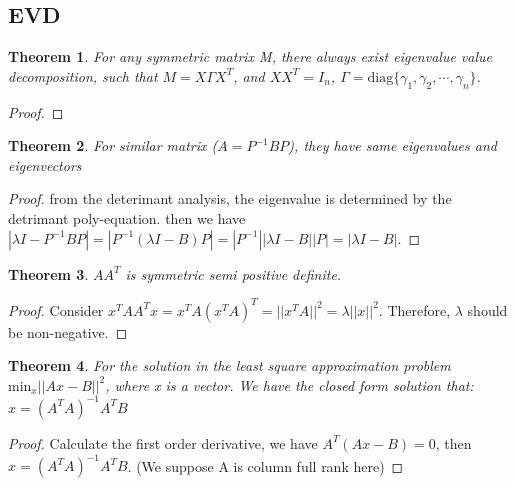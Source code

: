 \documentclass[12pt]{article}
\newtheorem{theorem}{Theorem}
\begin{document}
\subsection{EVD}
\begin{theorem}
	For any symmetric matrix M, there always exist eigenvalue value decomposition, such that $M=X\Gamma X^T$, and $XX^T=I_n$, $\Gamma=\text{diag}\{\gamma_1, \gamma_2,\cdots,\gamma_n\}$.
\end{theorem}
\begin{proof}
	
\end{proof}
\begin{theorem}
	For similar matrix ($A=P^{-1}BP$), they have same eigenvalues and eigenvectors
\end{theorem}
\begin{proof}
	from the deterimant analysis, the eigenvalue is determined by the detrimant poly-equation. then we have $|\lambda I - P^{-1}BP|=|P^{-1}(\lambda I-B)P|=|P^{-1}||\lambda I - B||P|=|\lambda I - B|.$
\end{proof}
\begin{theorem}
	$AA^T$ is symmetric semi positive definite.
\end{theorem}
\begin{proof}
	Consider $x^TAA^Tx=x^TA(x^TA)^T=||x^TA||^2=\lambda||x||^2.$ Therefore, $\lambda$ should be non-negative.
\end{proof}
\begin{theorem}
	For the solution in the least square approximation problem $\text{min}_x||Ax-B||^2$, where x is a vector. We have the closed form solution that: $x={(A^TA)}^{-1}A^TB$
\end{theorem}
\begin{proof}
	Calculate the first order derivative, we have $A^T(Ax-B)=0$, then $x={(A^TA)}^{-1}A^TB$. (We suppose A is column full rank here)
\end{proof}
\end{document}
